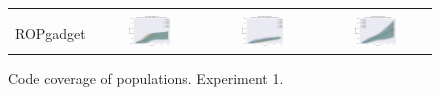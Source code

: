 \documentclass{article}
\begin{document}
\begin{landscape}
\begin{figure}[t]
\begin{center}
\begin{tabular}{c c c c}
    & & & \\
    ROPgadget & \includegraphics[align=c,width=0.42\textwidth]{cc/e1/4} & \includegraphics[align=c,width=0.42\textwidth]{cc/e1/5} & \includegraphics[align=c,width=0.42\textwidth]{cc/e1/6} \\
\end{tabular}
\end{center}
\caption{Code coverage of populations. Experiment 1.}
\label{fig:cc/e1}
\end{figure}


\end{landscape}
\end{document}
